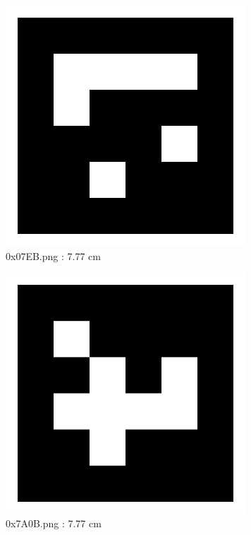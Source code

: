 \documentclass[11pt,a4,BCOR=0cm]{scrartcl}
\begin{document}
\begin{figure}
  \centering
    \includegraphics[natwidth=400,natheight=400,width=9cm]{0x07EB.png}
    \caption{0x07EB.png : 7.77 cm}
    \label{fig:0x07EB.png}
  
\end{figure} 

\clearpage

\begin{figure}
  \centering
    \includegraphics[natwidth=400,natheight=400,width=9cm]{0x7A0B.png}
    \caption{0x7A0B.png : 7.77 cm}
    \label{fig:0x7A0B.png}
  
\end{figure} 
\end{document}
